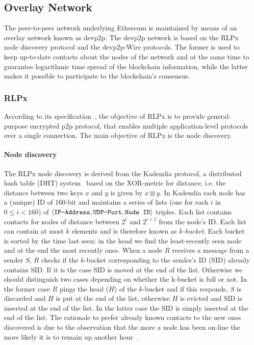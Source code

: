\subsection{Overlay Network}
\label{sec:overlay-network}
The peer-to-peer network underlying Ethereum is maintained by means of an
overlay network known as devp2p. The devp2p network is based on the
RLPx node discovery protocol and the devp2p-Wire protocols.
The former is used to keep up-to-date contacts about
the nodes of the network and at the same time to guarantee logarithmic time
spread of the blockchain information,
while the latter makes it possible to participate to the
blockchain's consensus.

\subsubsection{RLPx}
According to its specification~\cite{bib:rlpx:spec}, the objective of RLPx is to
provide general-purpose encrypted p2p protocol, that enables multiple
application-level protocols over a single connection.
The main objective of RLPx is the node discovery.

\paragraph{Node discovery}
The RLPx node discovery is derived from the Kademlia protocol,
a distributed hash table (DHT) system~\cite{bib:kademlia}
based on the XOR-metric for
distance, i.e. the distance between two keys $x$ and $y$ is given
by $x \otimes y$.
In Kademlia each node has a (unique) ID of 160-bit and maintains a
series of lists (one for each $i$ in $0 \leq i < 160$) of
$\langle \verb|IP-Address|, \verb|UDP-Port|, \verb|Node ID| \rangle$ triples.
Each list contains contacts for nodes of distance between $2^i$ and $2^{i+1}$
from the node's ID.
Each list can contain at most $k$ elements and is therefore known as
\textit{$k$-bucket}.
Each bucket is sorted by the time last
seen: in the head we find the least-recently seen node and at the end the most
recently ones.
When a node $R$ receives a message from a sender $S$, $R$ checks if the
$k$-bucket corresponding to the sender's ID (SID) already contains SID.
If it is the case SID is moved at the end of the list. Otherwise we should
distinguish two cases depending on whether the k-bucket is full or not.
In the former case $R$ pings the head ($H$) of the $k$-bucket and if
this responds, $S$ is discarded and $H$ is put at the end of the list,
otherwise $H$ is evicted and SID is inserted at the end of the list.
In the latter case the SID is simply inserted at the end of the list.
The rationale to prefer already known contacts to the new ones discovered
is due to the observation that the more a node has been on-line the more
likely it is to remain up another hour~\cite{bib:kademlia}.

